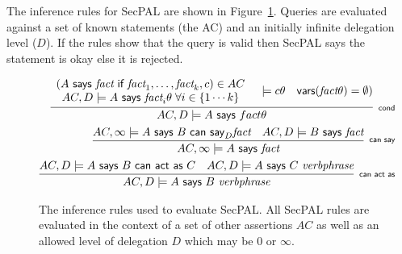 \documentclass[report.tex]{subfiles}
\begin{document}
The inference rules for SecPAL are shown in Figure~\ref{secpal:rules}.  Queries
are evaluated against a set of known statements (the \ac{AC}) and an initially
infinite delegation level ($D$).  If the rules show that the query is valid then
SecPAL says the statement is okay else it is rejected.

\begin{figure}\label{secpal:rules}
  \begin{eqnarray*}
    \infer[\textsf{\scriptsize cond}]{%
      AC, D \models A\textsf{~says~}fact\theta
    }{%
      \begin{array}[c]{c}
        \left(A\textsf{~says~}\textit{fact}\textsf{~if~}\textit{fact}_1, \ldots, \textit{fact}_k, c\right) \in AC \\
        AC,D\models A\textsf{~says~}\textit{fact}_i\theta \; \forall i \in \{1\cdots k\} 
      \end{array}
      & \models{c\theta}
      & \textsf{vars}(\textit{fact}\theta) = \emptyset)
    }\\
    \infer[\textsf{\scriptsize can say}]{%
      AC, \infty \models A\textsf{~says~}\textit{fact}
    }{%
      AC, \infty \models A\textsf{~says~}B\textsf{~can~say}_D \textit{fact} 
      & AC, D \models B\textsf{~says~}\textit{fact}
    } \\
    \infer[\textsf{\scriptsize can act as}]{%
      AC, D \models A\textsf{~says~}B~\textit{verbphrase}
    }{%
      AC, D \models A\textsf{~says~}B\textsf{~can~act~as~}C
      & AC, D \models A\textsf{~says~}C~\textit{verbphrase}
    }
  \end{eqnarray*}
  \caption{The inference rules used to evaluate {SecPAL}. All {SecPAL} rules are
  evaluated in the context of a set of other assertions $AC$ as well as an
  allowed level of delegation $D$ which may be $0$ or $\infty$.}
\end{figure}


 
\end{document}
